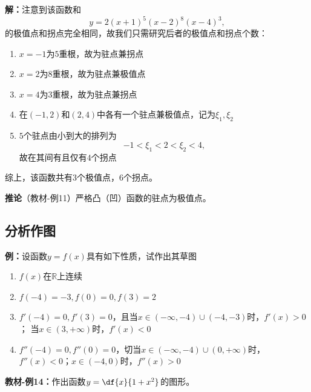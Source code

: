 \begin{shaded}
	{\bf 解：}注意到该函数和
	$$y=2(x+1)^5(x-2)^8(x-4)^3,$$
	的极值点和拐点完全相同，故我们只需研究后者的极值点和拐点个数：
	\begin{enumerate}[(1)]
  	  \setlength{\itemindent}{1cm}
	  \item $x=-1$为$5$重根，故为驻点兼拐点
	  \item $x=2$为$8$重根，故为驻点兼极值点
	  \item $x=4$为$3$重根，故为驻点兼拐点
	  \item 在$(-1,2)$和$(2,4)$中各有一个驻点兼极值点，记为$\xi_1,\xi_2$
	  \item $5$个驻点由小到大的排列为
	  $$-1<\xi_1<2<\xi_2<4,$$
	  故在其间有且仅有$4$个拐点
	\end{enumerate}
	
	综上，该函数共有$3$个极值点，$6$个拐点。
	
\end{shaded}

{\bf 推论}（教材-例11）严格凸（凹）函数的驻点为极值点。

\subsection{分析作图}

{\bf 例：}设函数$y=f(x)$具有如下性质，试作出其草图
\begin{enumerate}[(1)]
  \setlength{\itemindent}{1cm}
  \item $f(x)$在$\mathbb{R}$上连续
  \item $f(-4)=-3,f(0)=0,f(3)=2$
  \item $f'(-4)=0,f'(3)=0$，且当$x\in(-\infty,-4)\cup(-4,-3)$时，$f'(x)>0$；
  当$x\in(3,+\infty)$时，$f'(x)<0$
  \item $f''(-4)=0,f''(0)=0$，切当$x\in(-\infty,-4)\cup(0,+\infty)$时，
  $f''(x)<0$；$x\in(-4,0)$时，$f''(x)>0$
\end{enumerate}

{\bf 教材-例14：}作出函数$y=\df{x}{1+x^2}$的图形。

\begin{center}
\end{center}

